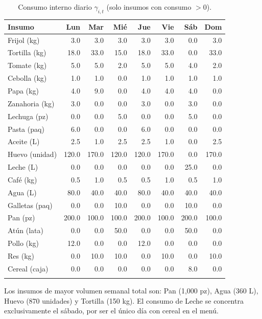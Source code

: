 \documentclass[12pt]{report}
\begin{document}
\begin{longtable}{lrrrrrrr}
\toprule
\textbf{Insumo} & \textbf{Lun} & \textbf{Mar} & \textbf{Mié} & \textbf{Jue} & \textbf{Vie} & \textbf{Sáb} & \textbf{Dom} \\
\midrule
\endhead
\bottomrule
\endfoot
Frijol (kg)     &  3.0 &  3.0 &  3.0 &  3.0 &  3.0 &  0.0 &  3.0 \\
Tortilla (kg)   & 18.0 & 33.0 & 15.0 & 18.0 & 33.0 &  0.0 & 33.0 \\
Tomate (kg)     &  5.0 &  5.0 &  2.0 &  5.0 &  5.0 &  4.0 &  2.0 \\
Cebolla (kg)    &  1.0 &  1.0 &  0.0 &  1.0 &  1.0 &  1.0 &  1.0 \\
Papa (kg)       &  4.0 &  9.0 &  0.0 &  4.0 &  4.0 &  4.0 &  0.0 \\
Zanahoria (kg)  &  3.0 &  0.0 &  0.0 &  3.0 &  0.0 &  3.0 &  0.0 \\
Lechuga (pz)    &  0.0 &  0.0 &  5.0 &  0.0 &  0.0 &  5.0 &  0.0 \\
Pasta (paq)     &  6.0 &  0.0 &  0.0 &  6.0 &  0.0 &  0.0 &  0.0 \\
Aceite (L)      &  2.5 &  1.0 &  2.5 &  2.5 &  1.0 &  0.0 &  2.5 \\
Huevo (unidad)  &120.0 &170.0 &120.0 &120.0 &170.0 &  0.0 &170.0 \\
Leche (L)       &  0.0 &  0.0 &  0.0 &  0.0 &  0.0 & 25.0 &  0.0 \\
Café (kg)       &  0.5 &  1.0 &  0.5 &  0.5 &  1.0 &  0.5 &  1.0 \\
Agua (L)        & 80.0 & 40.0 & 40.0 & 80.0 & 40.0 & 40.0 & 40.0 \\
Galletas (paq)  &  0.0 &  0.0 & 10.0 &  0.0 &  0.0 & 10.0 &  0.0 \\
Pan (pz)        &200.0 &100.0 &100.0 &200.0 &100.0 &200.0 &100.0 \\
Atún (lata)     &  0.0 &  0.0 & 50.0 &  0.0 &  0.0 & 50.0 &  0.0 \\
Pollo (kg)      & 12.0 &  0.0 &  0.0 & 12.0 &  0.0 &  0.0 &  0.0 \\
Res (kg)        &  0.0 & 10.0 & 10.0 &  0.0 & 10.0 &  0.0 & 10.0 \\
Cereal (caja)   &  0.0 &  0.0 &  0.0 &  0.0 &  0.0 &  8.0 &  0.0 \\
\caption{Consumo interno diario $\gamma_{i,t}$ (solo insumos con consumo $> 0$).}
\label{tab:consumo}
\end{longtable}

\noindent Los insumos de mayor volumen semanal total son: Pan (1{,}000 pz),
Agua (360 L), Huevo (870 unidades) y Tortilla (150 kg). El consumo de Leche
se concentra exclusivamente el sábado, por ser el único día con cereal en el menú.
\end{document}
